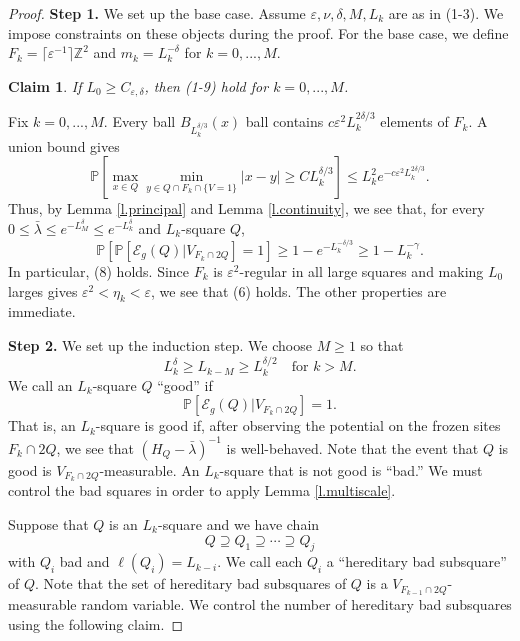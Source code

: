 \documentclass{amsart}
\newtheorem{claim}[equation]{Claim}
\newcommand{\lref}[1]{Lemma \ref{l.#1}}
\numberwithin{equation}{section}
\numberwithin{figure}{section}
\newcommand{\Z}{\mathbb{Z}}
\renewcommand{\P}{\mathbb{P}}
\newcommand{\ep}{\varepsilon}
\begin{document}
\begin{proof}
{\bf Step 1.} We set up the base case.  Assume $\ep, \nu, \delta, M, L_k$ are as in (1-3).  We impose constraints on these objects during the proof.  For the base case, we define $F_k = \lceil \ep^{-1} \rceil \Z^2$ and $m_k = L_k^{-\delta}$ for $k = 0, ..., M$.

\begin{claim}
If $L_0 \geq C_{\ep,\delta}$, then (1-9) hold for $k = 0, ..., M$.
\end{claim}

Fix $k = 0, ..., M$.  Every ball $B_{L_k^{\delta/3}}(x)$ ball contains $c \ep^2 L_k^{2 \delta / 3}$ elements of $F_k$.  A union bound gives
\begin{equation*}
\P\left[\max_{x \in Q} \min_{y \in Q \cap F_k \cap \{ V = 1 \}} |x-y| \geq C L_k^{\delta/3}\right] \leq L_k^2 e^{-c \ep^2 L_k^{2\delta/3}}.
\end{equation*}
Thus, by \lref{principal} and \lref{continuity}, we see that, for every $0 \leq \bar \lambda \leq e^{-L_M^\delta} \leq e^{-L_k^\delta}$ and $L_k$-square $Q$,
\begin{equation*}
\P[\P[\mathcal E_g(Q)|V_{F_k \cap 2Q}] = 1] \geq 1 - e^{-L_k^{-\delta/3}} \geq 1 - L_k^{-\gamma}.
\end{equation*}
In particular, (8) holds.  Since $F_k$ is $\ep^2$-regular in all large squares and making $L_0$ larges gives $\ep^2 < \eta_k < \ep$, we see that (6) holds.  The other properties are immediate.

{\bf Step 2.}  We set up the induction step.  We choose $M \geq 1$ so that
\begin{equation*}
L_k^{\delta} \geq L_{k-M} \geq L_k^{\delta/2} \quad \mbox{for } k > M.
\end{equation*}
We call an $L_k$-square $Q$ ``good'' if
\begin{equation*}
\P[\mathcal E_g(Q) | V_{F_k \cap 2 Q}] = 1.
\end{equation*}
That is, an $L_k$-square is good if, after observing the potential on the frozen sites $F_k \cap 2Q$, we see that $(H_Q - \bar \lambda)^{-1}$ is well-behaved.  Note that the event that $Q$ is good is $V_{F_k \cap 2Q}$-measurable.  An $L_k$-square that is not good is ``bad.''  We must control the bad squares in order to apply \lref{multiscale}.

Suppose that $Q$ is an $L_k$-square and we have chain
\begin{equation*}
Q \supseteq Q_1 \supseteq \cdots \supseteq Q_j
\end{equation*}
with $Q_i$ bad and $\ell(Q_i) = L_{k-i}$.  We call each $Q_i$ a ``hereditary bad subsquare'' of $Q$.  Note that the set of hereditary bad subsquares of $Q$ is a $V_{F_{k-1} \cap 2Q}$-measurable random variable.  We control the number of hereditary bad subsquares using the following claim.


\end{proof}
\end{document}
